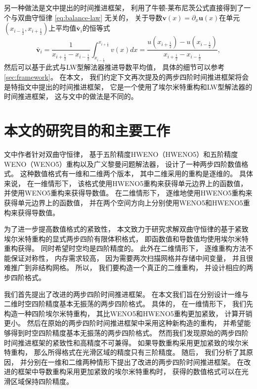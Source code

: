 另一种做法是文\cite{li2016two}中提出的时间推进框架，
利用了牛顿-莱布尼茨公式直接得到了一个与双曲守恒律 \cref{eq:balance-law} 无关的，
关于导数${\bm v}(x)={\partial_x}\bm u(x)$在单元$(x_{i-\frac{1}{2}},x_{i+\frac{1}{2}})$上平均值$\bar{\bm v}_i$的恒等式
\begin{equation}
  \bar{\bm v}_i =\frac{1}{x_{i+\frac{1}{2}} -  x_{i-\frac{1}{2}}}\int_{x_{i-\frac{1}{2}}}^{x_{i+\frac{1}{2}}} v(x) dx= \frac{u(x_{i+\frac{1}{2}}) -  u(x_{i-\frac{1}{2}})}{x_{i+\frac{1}{2}} -  x_{i-\frac{1}{2}}},
\end{equation}
然后可以基于此式与LW型解法器推进导数平均值，
具体的细节可以参考\cref{sec:framework}。
在本文，
我们约定下文再次提及的两步四阶时间推进框架将会是特指文\cite{li2016two}中提出的时间推进框架，
它是一个使用了埃尔米特重构和LW型解法器的时间推进框架，
这与文\cite{Qiu-Shu-2004,S2O4_wenli}中的做法是不同的。

\section{本文的研究目的和主要工作}

文\cite{du2018hermite}中作者针对双曲守恒律，
基于五阶精度HWENO（HWENO5）和五阶精度WENO（WENO5）重构以及广义黎曼问题解法器，
设计了一种两步四阶数值格式。
这种数值格式有一维和二维两个版本，
其中二维采用的重构是逐维的。
具体来说，
在一维情形下，
该格式使用HWENO5重构来获得单元边界上的函数值，
并使用WENO5重构来获得导数值。
在二维情形下，
逐维地使用HWENO5重构来获得单元边界上的函数值，
并在两个空间方向上分别使用WENO5和HWENO5重构来获得导数值。

为了进一步提高数值格式的紧致性，
本文致力于研究求解双曲守恒律的基于紧致埃尔米特重构的显式两步四阶有限体积格式，
即函数值和导数值均使用埃尔米特重构获得。
同时希望时空均是四阶精度的。
此外在二维情形下，
逐维重构方法不能保证对称性，
内存需求较高，
因为需要两次扫描网格并存储中间变量，
并且很难推广到非结构网格。
所以，
我们要构造一个真正的二维重构，
并设计相应的两步四阶格式。

我们首先提出了改进的两步四阶时间推进框架。
在本文我们旨在分别设计一维与二维时空四阶精度基本无振荡的两步四阶格式。
具体的，
在一维情形下，
我们先构造一种四阶埃尔米特重构，
其比WENO5和HWENO5重构更加紧致，
计算开销更小。
然后在原始的两步四阶时间推进框架中采用这种新构造的重构，
并希望能够得到时空四阶精度基本无振荡的两步四阶格式。
然而我们发现原始的两步四阶时间推进框架的紧致性和高精度不可兼得。
如果导数重构采用更加紧致的埃尔米特重构，
那么所得格式在光滑区域的精度只有三阶精度。
随后，
我们分析了其原因，
并分别在一维和二维两种情形下提出了改进的两步四阶时间推进框架。
在改进的框架中导数重构采用更加紧致的埃尔米特重构时，
获得的数值格式可以在光滑区域保持四阶精度。

